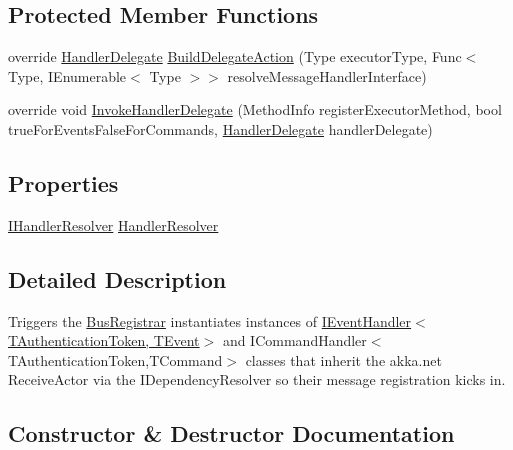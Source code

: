 \subsection*{Protected Member Functions}
\begin{DoxyCompactItemize}
\item 
override \hyperlink{classCqrs_1_1Configuration_1_1HandlerDelegate}{Handler\+Delegate} \hyperlink{classCqrs_1_1Akka_1_1Configuration_1_1AkkaBusRegistrar_ad7e3e5d332d5b4d781375a28f23bdb19}{Build\+Delegate\+Action} (Type executor\+Type, Func$<$ Type, I\+Enumerable$<$ Type $>$$>$ resolve\+Message\+Handler\+Interface)
\item 
override void \hyperlink{classCqrs_1_1Akka_1_1Configuration_1_1AkkaBusRegistrar_a0ac474751b2ba8ebb27b885a15fbf053}{Invoke\+Handler\+Delegate} (Method\+Info register\+Executor\+Method, bool true\+For\+Events\+False\+For\+Commands, \hyperlink{classCqrs_1_1Configuration_1_1HandlerDelegate}{Handler\+Delegate} handler\+Delegate)
\end{DoxyCompactItemize}
\subsection*{Properties}
\begin{DoxyCompactItemize}
\item 
\hyperlink{interfaceCqrs_1_1Akka_1_1Configuration_1_1IHandlerResolver}{I\+Handler\+Resolver} \hyperlink{classCqrs_1_1Akka_1_1Configuration_1_1AkkaBusRegistrar_a642cd7215c2f51cfaff263f9ba95a4c4}{Handler\+Resolver}
\end{DoxyCompactItemize}


\subsection{Detailed Description}
Triggers the \hyperlink{classCqrs_1_1Configuration_1_1BusRegistrar_a4a934d21a535b28af6c67154512bba20}{Bus\+Registrar} instantiates instances of \hyperlink{interfaceCqrs_1_1Events_1_1IEventHandler}{I\+Event\+Handler$<$\+T\+Authentication\+Token, T\+Event$>$} and I\+Command\+Handler$<$\+T\+Authentication\+Token,\+T\+Command$>$ classes that inherit the akka.\+net Receive\+Actor via the I\+Dependency\+Resolver so their message registration kicks in. 



\subsection{Constructor \& Destructor Documentation}
\mbox{\label{classCqrs_1_1Akka_1_1Configuration_1_1AkkaBusRegistrar_a49ab48e3305b6eb17f2a68fc2996a988}} 
